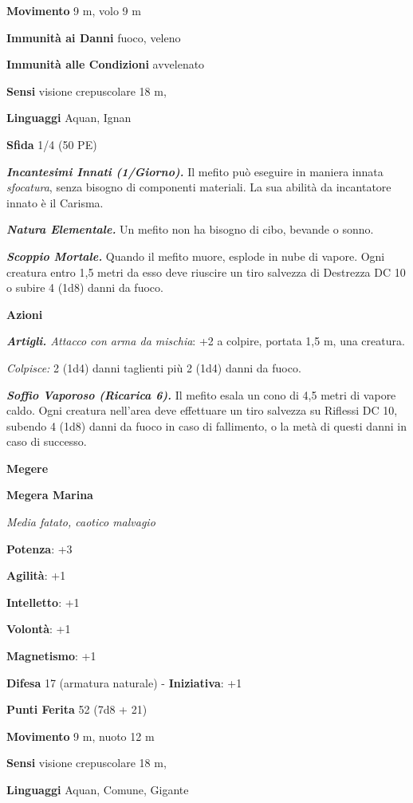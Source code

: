 \begin{multicols}{2}
\textbf{Movimento} 9 m, volo 9 m

\textbf{Immunità ai Danni} fuoco, veleno

\textbf{Immunità alle Condizioni} avvelenato

\textbf{Sensi} visione crepuscolare 18 m, 

\textbf{Linguaggi} Aquan, Ignan

\textbf{Sfida} 1/4 (50 PE)

\emph{\textbf{Incantesimi Innati (1/Giorno).}} Il mefito può eseguire in
maniera innata \emph{sfocatura}, senza bisogno di componenti materiali.
La sua abilità da incantatore innato è il Carisma.

\emph{\textbf{Natura Elementale.}} Un mefito non ha bisogno di cibo,
bevande o sonno.

\emph{\textbf{Scoppio Mortale.}} Quando il mefito muore, esplode in nube
di vapore. Ogni creatura entro 1,5 metri da esso deve riuscire un tiro
salvezza di Destrezza DC 10 o subire 4 (1d8) danni da fuoco.

\textbf{Azioni}

\emph{\textbf{Artigli.} Attacco con arma da mischia}: +2 a colpire,
portata 1,5 m, una creatura.

\emph{Colpisce:} 2 (1d4) danni taglienti più 2 (1d4) danni da fuoco.

\emph{\textbf{Soffio Vaporoso (Ricarica 6).}} Il mefito esala un cono di
4,5 metri di vapore caldo. Ogni creatura nell'area deve effettuare un
tiro salvezza su Riflessi DC 10, subendo 4 (1d8) danni da fuoco in caso
di fallimento, o la metà di questi danni in caso di successo.

\textbf{Megere}

\textbf{Megera Marina}

\emph{Media fatato, caotico malvagio}

\textbf{Potenza}: +3

\textbf{Agilità}: +1

\textbf{Intelletto}: +1

\textbf{Volontà}: +1

\textbf{Magnetismo}: +1

\textbf{Difesa} 17 (armatura naturale) - \textbf{Iniziativa}: +1

\textbf{Punti Ferita} 52 (7d8 + 21)

\textbf{Movimento} 9 m, nuoto 12 m

\textbf{Sensi} visione crepuscolare 18 m, 

\textbf{Linguaggi} Aquan, Comune, Gigante


\end{multicols}
